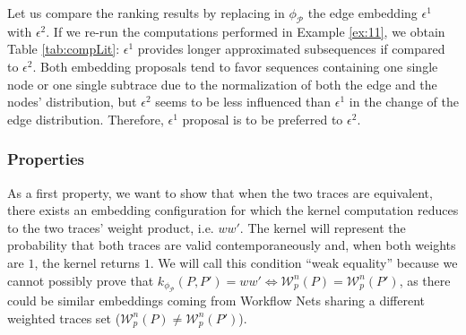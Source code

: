 \begin{example}\label{ex:cmpexample}
	Let us compare the ranking results by replacing in $\phi_{\mathcal{P}}$ the edge embedding $\epsilon^1$ with $\epsilon^2$. If we re-run the computations performed in  Example \ref{ex:11}, we obtain   Table \ref{tab:compLit}:  $\epsilon^1$ provides longer approximated subsequences if compared to $\epsilon^2$. Both embedding proposals tend to favor sequences containing one single node or one single subtrace due to the normalization of both  the edge and the nodes' distribution, but $\epsilon^2$ seems to be less influenced than $\epsilon^1$ in the change of the edge distribution. Therefore, $\epsilon^1$ proposal is to be preferred to $\epsilon^2$.
\end{example}


\subsubsection{Properties}
As a first property, we want to show that when the two traces are equivalent,  there exists an embedding configuration for which the kernel computation reduces to the two traces' weight product, i.e. $ww'$. The kernel will   represent the probability that both traces are valid contemporaneously and, when both weights are $1$, the kernel returns $1$. We will call this condition  ``weak equality'' because we cannot possibly prove that $k_{\phi_{\mathcal{P}}}(P,P')=ww'\Leftrightarrow \mathcal{W}_p^n(P)=\mathcal{W}_p^n(P')$, as there could be similar embeddings coming from Workflow Nets sharing a different weighted traces set ($\mathcal{W}_p^n(P)\neq\mathcal{W}_p^n(P')$).

